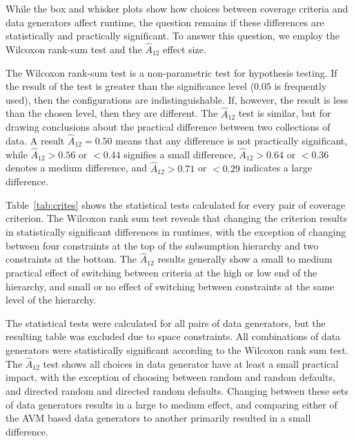 
While the box and whisker plots show how choices between coverage criteria and data generators affect runtime, the
question remains if these differences are statistically and practically significant. To answer this question, we employ
the Wilcoxon rank-sum test and the $\hat{A}_{12}$ effect size.

The Wilcoxon rank-sum test is a non-parametric test for hypothesis testing.  If the result of the test is greater than
the significance level ($0.05$ is frequently used), then the configurations are indistinguishable.  If, however, the
result is less than the chosen level, then they are different.  The $\hat{A}_{12}$ test is similar, but for drawing
conclusions about the practical difference between two collections of data.  A result $\hat{A}_{12}=0.50$ means that any
difference is not practically significant, while $\hat{A}_{12}>0.56$ or $<0.44$ signifies a small difference,
$\hat{A}_{12}>0.64$ or $<0.36$ denotes a medium difference, and $\hat{A}_{12}>0.71$ or $<0.29$ indicates a large
difference.

Table~\ref{tab:crites} shows the statistical tests calculated for every pair of coverage criterion. The Wilcoxon rank
sum test reveals that changing the criterion results in statistically significant differences in runtimes, with the
exception of changing between four constraints at the top of the subsumption hierarchy and two constraints at the
bottom.  The $\hat{A}_{12}$ results generally show a small to medium practical effect of switching between criteria at
the high or low end of the hierarchy, and small or no effect of switching between constraints at the same level of the
hierarchy.

The statistical tests were calculated for all pairs of data generators, but the resulting table was excluded due to
space constraints. All combinations of data generators were statistically significant according to the Wilcoxon rank sum
test. The $\hat{A}_{12}$ test shows all choices in data generator have at least a small practical impact, with the
exception of choosing between random and random defaults, and directed random and directed random defaults.  Changing
between these sets of data generators results in a large to medium effect, and comparing either of the AVM based data
generators to another primarily resulted in a small difference.
